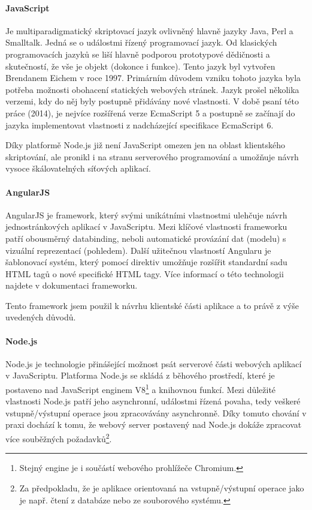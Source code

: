 \documentclass[ing,male,java,dept460]{diploma}						%
\begin{document}
\paragraph{JavaScript}
Je multiparadigmatický skriptovací jazyk ovlivněný hlavně jazyky Java, Perl a Smalltalk. Jedná se o událostmi řízený programovací jazyk. Od klasických programovacích jazyků se liší hlavně podporou prototypové dědičnosti a skutečností, že vše je objekt (dokonce i funkce). Tento jazyk byl vytvořen Brendanem Eichem v roce 1997. Primárním důvodem vzniku tohoto jazyka byla potřeba možnosti obohacení statických webových stránek. Jazyk prošel několika verzemi, kdy do něj byly postupně přidávány nové vlastnosti. V době psaní této práce (2014), je nejvíce rozšířená verze EcmaScript 5 a postupně se začínají do jazyka implementovat vlastnosti z nadcházející specifikace EcmaScript 6.

Díky platformě Node.js již není JavaScript omezen jen na oblast klientského skriptování, ale pronikl i na stranu serverového programování a umožňuje návrh vysoce škálovatelných síťových aplikací.

\paragraph{AngularJS}
AngularJS je framework, který svými unikátními vlastnostmi ulehčuje návrh jednostránkových aplikací v JavaScriptu. Mezi klíčové vlastnosti frameworku patří obousměrný databinding, neboli automatické provázání dat (modelu) s vizuální reprezentací (pohledem). Další užitečnou vlastností Angularu je šablonovací systém, který pomocí direktiv umožňuje rozšířit standardní sadu HTML tagů o nové specifické HTML tagy. Více informací o této technologii najdete v dokumentaci frameworku\cite{angulardocs}.

Tento framework jsem použil k návrhu klientské části aplikace a to právě z výše uvedených důvodů.

\paragraph{Node.js}
Node.js\cite{nodejs} je technologie přinášející možnost psát serverové části webových aplikací v JavaScriptu. Platforma Node.js se skládá z běhového prostředí, které je postaveno nad JavaScript enginem V8\footnote{Stejný engine je i součástí webového prohlížeče Chromium.} a knihovnou funkcí. Mezi důležité vlastnosti Node.js patří jeho asynchronní, událostmi řízená povaha, tedy veškeré vstupně/výstupní operace jsou zpracovávány asynchronně. Díky tomuto chování v praxi dochází k tomu, že webový server postavený nad Node.js dokáže zpracovat více souběžných požadavků\footnote{Za předpokladu, že je aplikace orientovaná na vstupně/výstupní operace jako je např. čtení z databáze nebo ze souborového systému.}.
\end{document}
